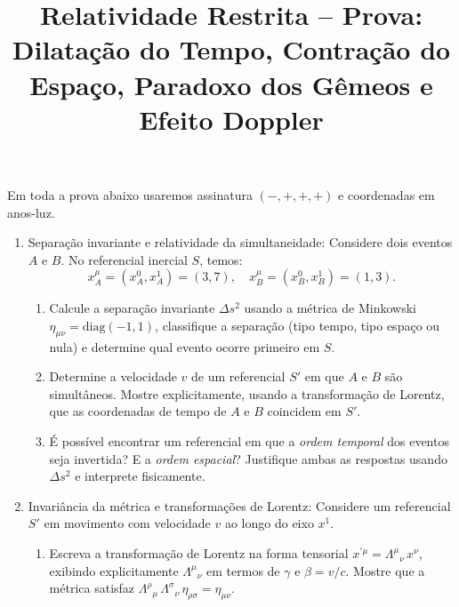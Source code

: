 \newif\ifuseseminar
\useseminartrue


\title{Relatividade Restrita -- Prova: Dilatação do Tempo, Contração do Espaço, Paradoxo dos Gêmeos e Efeito Doppler}



Em toda a prova abaixo usaremos assinatura $(-,+,+,+)$ e coordenadas em anos-luz.

\begin{enumerate}

      \item Separação invariante e relatividade da simultaneidade: Considere dois
            eventos $A$ e $B$. No referencial inercial $S$, temos:
            $$
                  x_A^\mu = (x^0_A, x^1_A) = (3, 7), \quad
                  x_B^\mu = (x^0_B, x^1_B) = (1, 3).
            $$

            \begin{enumerate}
                  \item Calcule a separação invariante $\Delta s^2$ usando a métrica
                        de Minkowski $\eta_{\mu\nu} = \mathrm{diag}(-1,1)$, classifique
                        a separação (tipo tempo, tipo espaço ou nula) e determine qual
                        evento ocorre primeiro em $S$.

                  \item Determine a velocidade $v$ de um referencial $S'$ em que $A$
                        e $B$ são simultâneos. Mostre explicitamente, usando a
                        transformação de Lorentz, que as coordenadas de tempo de $A$ e
                        $B$ coincidem em $S'$.

                  \item É possível encontrar um referencial em que a \emph{ordem
                              temporal} dos eventos seja invertida? E a \emph{ordem
                              espacial}? Justifique ambas as respostas usando $\Delta s^2$ e
                        interprete fisicamente.
            \end{enumerate}

      \item Invariância da métrica e transformações de Lorentz: Considere um
            referencial $S'$ em movimento com velocidade $v$ ao longo do eixo $x^1$.

            \begin{enumerate}
                  \item Escreva a transformação de Lorentz na forma tensorial
                        $x^{\prime\mu} = \Lambda^\mu{}_\nu\, x^\nu$, exibindo
                        explicitamente $\Lambda^\mu{}_\nu$ em termos de $\gamma$ e
                        $\beta = v/c$. Mostre que a métrica satisfaz
                        $\Lambda^\rho{}_\mu\, \Lambda^\sigma{}_\nu\, \eta_{\rho\sigma}
                              = \eta_{\mu\nu}$.


\end{enumerate}
\end{enumerate}
